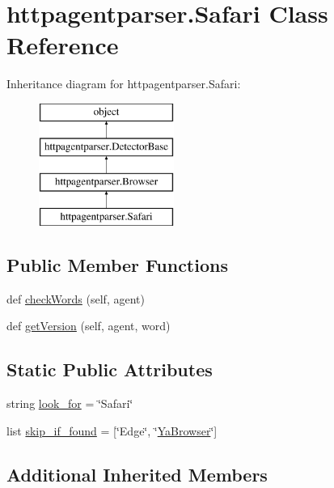 \hypertarget{classhttpagentparser_1_1_safari}{}\section{httpagentparser.\+Safari Class Reference}
\label{classhttpagentparser_1_1_safari}
Inheritance diagram for httpagentparser.\+Safari\+:\begin{figure}[H]
\begin{center}
\leavevmode
\includegraphics[height=4.000000cm]{classhttpagentparser_1_1_safari}
\end{center}
\end{figure}
\subsection*{Public Member Functions}
\begin{DoxyCompactItemize}
\item 
def \hyperlink{classhttpagentparser_1_1_safari_a5349dc1dbbbd4a3a8696dae111740ca3}{check\+Words} (self, agent)
\item 
def \hyperlink{classhttpagentparser_1_1_safari_ad66c2eb844665a7c172abdfe661a691a}{get\+Version} (self, agent, word)
\end{DoxyCompactItemize}
\subsection*{Static Public Attributes}
\begin{DoxyCompactItemize}
\item 
string \hyperlink{classhttpagentparser_1_1_safari_a2cd5aabde41192cd9e912de24e94bb59}{look\+\_\+for} = \char`\"{}Safari\char`\"{}
\item 
list \hyperlink{classhttpagentparser_1_1_safari_a0e451bfa2174a48aced1b64f05eda439}{skip\+\_\+if\+\_\+found} = \mbox{[}\char`\"{}Edge\char`\"{}, \char`\"{}\hyperlink{classhttpagentparser_1_1_ya_browser}{Ya\+Browser}\char`\"{}\mbox{]}
\end{DoxyCompactItemize}
\subsection*{Additional Inherited Members}


